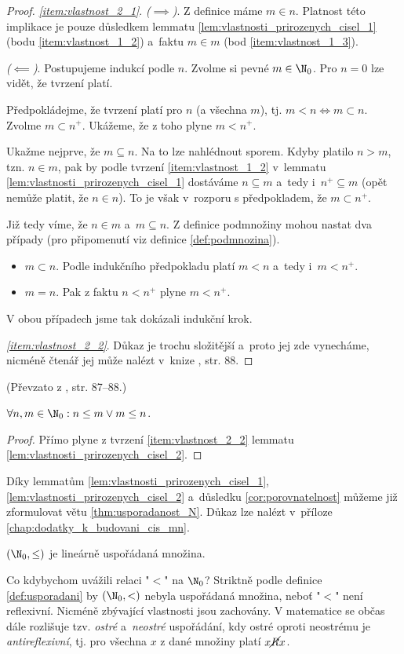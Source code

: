 \begin{proof}
    \textit{\ref{item:vlastnost_2_1}}. \textit{($\implies$)}. Z definice máme $m\in n$. Platnost této implikace je pouze důsledkem lemmatu \ref{lem:vlastnosti_prirozenych_cisel_1} (bodu \ref{item:vlastnost_1_2}) a~faktu $m\in m$ (bod \ref{item:vlastnost_1_3}).\par
    \textit{($\impliedby$)}. Postupujeme indukcí podle $n$. Zvolme si pevné $m\in\N_0$. Pro $n=0$ lze vidět, že tvrzení platí.\par
    Předpokládejme, že tvrzení platí pro $n$ (a všechna $m$), tj. $m<n\iff m\subset n$. Zvolme $m\subset n^+$. Ukážeme, že z toho plyne $m<n^+$.\par
    Ukažme nejprve, že $m\subseteq n$. Na to lze nahlédnout sporem. Kdyby platilo $n>m$, tzn. $n\in m$, pak by podle tvrzení \ref{item:vlastnost_1_2} v~lemmatu \ref{lem:vlastnosti_prirozenych_cisel_1} dostáváme $n\subseteq m$ a~tedy i~$n^+\subseteq m$ (opět nemůže platit, že $n\in n$). To je však v~rozporu s předpokladem, že $m\subset n^+$.\par
    Již tedy víme, že $n\in m$ a~$m\subseteq n$. Z definice podmnožiny mohou nastat dva případy (pro připomenutí viz definice \ref{def:podmnozina}).
    \begin{itemize}
        \item $m\subset n$. Podle indukčního předpokladu platí $m<n$ a~tedy i~$m<n^+$.
        \item $m=n$. Pak z faktu $n<n^+$ plyne $m<n^+$.
    \end{itemize}
    V obou případech jsme tak dokázali indukční krok.\par
    \textit{\ref{item:vlastnost_2_2}}. Důkaz je trochu složitější a~proto jej zde vynecháme, nicméně čtenář jej může nalézt v~knize \cite{BalcarStepanek1986}, str. 88.
\end{proof}
(Převzato z \cite{BalcarStepanek1986}, str. 87--88.)\par
\begin{corollary}\label{cor:porovnatelnost}
    $\forall n,m\in\N_0: n\leq m \lor m\leq n$.
\end{corollary}
\begin{proof}
    Přímo plyne z tvrzení \ref{item:vlastnost_2_2} lemmatu \ref{lem:vlastnosti_prirozenych_cisel_2}.
\end{proof}
Díky lemmatům \ref{lem:vlastnosti_prirozenych_cisel_1}, \ref{lem:vlastnosti_prirozenych_cisel_2} a~důsledku \ref{cor:porovnatelnost} můžeme již zformulovat větu \ref{thm:usporadanost_N}. Důkaz lze nalézt v~příloze \ref{chap:dodatky_k_budovani_cis_mn}.
\begin{theorem}\label{thm:usporadanost_N}
    $(\N_0,\leq)$ je lineárně uspořádaná množina.
\end{theorem}
Co kdybychom uvážili relaci "$<$" na $\N_0$? Striktně podle definice \ref{def:usporadani} by $(\N_0,<)$ nebyla uspořádaná množina, neboť "$<$" není reflexivní. Nicméně zbývající vlastnosti jsou zachovány. V matematice se občas dále rozlišuje tzv. \emph{ostré} a~\emph{neostré} uspořádání, kdy ostré oproti neostrému je \emph{antireflexivní}, tj. pro všechna $x$ z dané množiny platí $x\cancel{R}x$.